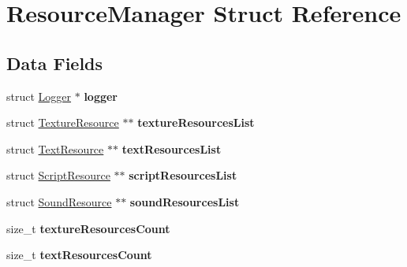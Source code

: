 \hypertarget{struct_resource_manager}{}\section{Resource\+Manager Struct Reference}
\label{struct_resource_manager}
\subsection*{Data Fields}
\begin{DoxyCompactItemize}
\item 
\hypertarget{struct_resource_manager_af4d650f26e6e1a4b53c751abc1eff45e}{}\label{struct_resource_manager_af4d650f26e6e1a4b53c751abc1eff45e} 
struct \hyperlink{struct_logger}{Logger} $\ast$ {\bfseries logger}
\item 
\hypertarget{struct_resource_manager_a2953b1a0b89f028a2ecbd5dc6330eff4}{}\label{struct_resource_manager_a2953b1a0b89f028a2ecbd5dc6330eff4} 
struct \hyperlink{struct_texture_resource}{Texture\+Resource} $\ast$$\ast$ {\bfseries texture\+Resources\+List}
\item 
\hypertarget{struct_resource_manager_a5fd66af5d432af1325f53a9a2300eae1}{}\label{struct_resource_manager_a5fd66af5d432af1325f53a9a2300eae1} 
struct \hyperlink{struct_text_resource}{Text\+Resource} $\ast$$\ast$ {\bfseries text\+Resources\+List}
\item 
\hypertarget{struct_resource_manager_ab99aaaf14cd1c4d887f068961bc5ff80}{}\label{struct_resource_manager_ab99aaaf14cd1c4d887f068961bc5ff80} 
struct \hyperlink{struct_script_resource}{Script\+Resource} $\ast$$\ast$ {\bfseries script\+Resources\+List}
\item 
\hypertarget{struct_resource_manager_a1eb76005d8836f5ffd80e3da1ca83988}{}\label{struct_resource_manager_a1eb76005d8836f5ffd80e3da1ca83988} 
struct \hyperlink{struct_sound_resource}{Sound\+Resource} $\ast$$\ast$ {\bfseries sound\+Resources\+List}
\item 
\hypertarget{struct_resource_manager_ab6e73801084fc078f24e0534d40404aa}{}\label{struct_resource_manager_ab6e73801084fc078f24e0534d40404aa} 
size\+\_\+t {\bfseries texture\+Resources\+Count}
\item 
\hypertarget{struct_resource_manager_abb8f51be13888056994ca65f979e9e89}{}\label{struct_resource_manager_abb8f51be13888056994ca65f979e9e89} 
size\+\_\+t {\bfseries text\+Resources\+Count}
\item 
\hypertarget{struct_resource_manager_a0b77179a9b96bf923868a1e01d62cf06}{}\label{struct_resource_manager_a0b77179a9b96bf923868a1e01d62cf06} 

\end{DoxyCompactItemize}
